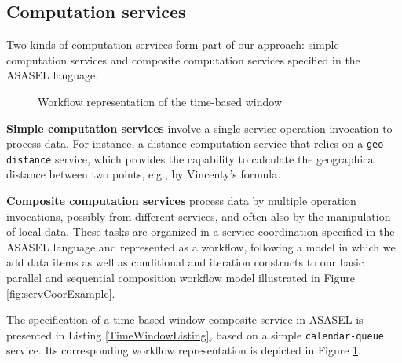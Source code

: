 \subsection{Computation services}\label{subsec:computationServices}

Two kinds of computation services form part of our approach: simple computation services and composite computation services specified in the ASASEL language.

\begin{figure}
   \begin{center}
   \end{center}
   \caption{Workflow representation of the time-based window}
   \label{fig:timeBasedWindowWF}
\end{figure}

\textbf{Simple computation services}  involve a single service operation invocation to process data. For instance, a distance computation service that relies on a \texttt{geo-distance} service, which provides the capability to calculate the geographical distance between two points, e.g., by Vincenty's formula.

\textbf{Composite computation services}  process data by multiple operation invocations, possibly from different services, and often also by the manipulation of local data. These tasks are organized in a service coordination specified in the ASASEL language and represented as a workflow, following a model in which we add data items as well as conditional and iteration constructs to our basic parallel and sequential composition workflow model illustrated in Figure \ref{fig:servCoorExample}.
		
The specification of a time-based window composite service in ASASEL is presented in Listing \ref{TimeWindowListing}, based on a simple \texttt{calendar-queue} service. Its corresponding workflow representation is depicted in Figure \ref{fig:timeBasedWindowWF}.
		
